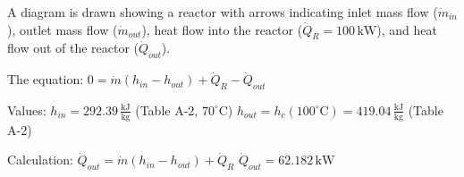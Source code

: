 A diagram is drawn showing a reactor with arrows indicating inlet mass flow (\( \dot{m}_{in} \)), outlet mass flow (\( \dot{m}_{out} \)), heat flow into the reactor (\( \dot{Q}_R = 100 \, \text{kW} \)), and heat flow out of the reactor (\( \dot{Q}_{out} \)).  

The equation:  
\( 0 = \dot{m} (h_{in} - h_{out}) + \dot{Q}_R - \dot{Q}_{out} \)  

Values:  
\( h_{in} = 292.39 \, \frac{\text{kJ}}{\text{kg}} \) (Table A-2, \( 70^\circ \text{C} \))  
\( h_{out} = h_c (100^\circ \text{C}) = 419.04 \, \frac{\text{kJ}}{\text{kg}} \) (Table A-2)  

Calculation:  
\( \dot{Q}_{out} = \dot{m} (h_{in} - h_{out}) + \dot{Q}_R \)  
\( \dot{Q}_{out} = 62.182 \, \text{kW} \)